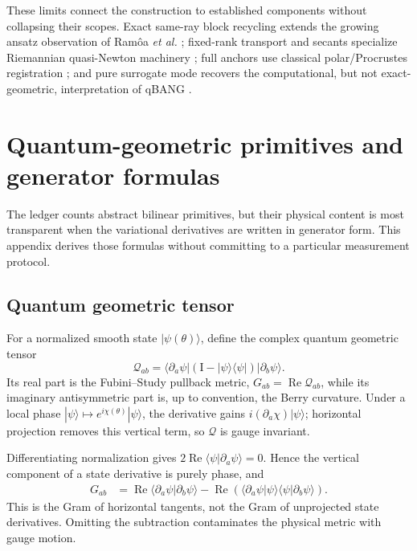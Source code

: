 \documentclass[10pt,twocolumn]{article}
\theoremstyle{definition}
\theoremstyle{remark}
\newcommand{\Id}{\mathrm I}
\newcommand{\Rea}{\operatorname{Re}}
\begin{document}
\begin{litbox}
These limits connect the construction to established components without
collapsing their scopes.  Exact same-ray block recycling extends the growing
ansatz observation of Ram\^oa \emph{et al.} \cite{Ramoa2025}; fixed-rank
transport and secants specialize Riemannian quasi-Newton machinery
\cite{Huang2015,Huang2018}; full anchors use classical polar/Procrustes
registration \cite{Schonemann1966,Higham1986}; and pure surrogate mode
recovers the computational, but not exact-geometric, interpretation of
qBANG \cite{Fitzek2024}.
\end{litbox}

\section{Quantum-geometric primitives and generator formulas}
\label{app:quantumprimitives}

The ledger counts abstract bilinear primitives, but their physical content is
most transparent when the variational derivatives are written in generator
form.  This appendix derives those formulas without committing to a
particular measurement protocol.

\subsection{Quantum geometric tensor}

For a normalized smooth state $|\psi(\theta)\rangle$, define the complex
quantum geometric tensor
\begin{equation}
 \mathcal Q_{ab}
 =\langle\partial_a\psi|
  (\Id-|\psi\rangle\langle\psi|)
  |\partial_b\psi\rangle .
 \label{eq:appQGT}
\end{equation}
Its real part is the Fubini--Study pullback metric,
$G_{ab}=\Rea\mathcal Q_{ab}$, while its imaginary antisymmetric part is,
up to convention, the Berry curvature.  Under a local phase
$|\psi\rangle\mapsto e^{i\chi(\theta)}|\psi\rangle$, the derivative gains
$i(\partial_a\chi)|\psi\rangle$; horizontal projection removes this vertical
term, so $\mathcal Q$ is gauge invariant.

Differentiating normalization gives
$2\Rea\langle\psi|\partial_a\psi\rangle=0$.  Hence the vertical component of a
state derivative is purely phase, and
\begin{align}
 G_{ab}
 &=\Rea\langle\partial_a\psi|\partial_b\psi\rangle
 -\Rea\!\left(
 \langle\partial_a\psi|\psi\rangle
 \langle\psi|\partial_b\psi\rangle\right).
 \label{eq:appQGTexpanded}
\end{align}
This is the Gram of horizontal tangents, not the Gram of unprojected state
derivatives.  Omitting the subtraction contaminates the physical metric with
gauge motion.
\end{document}
